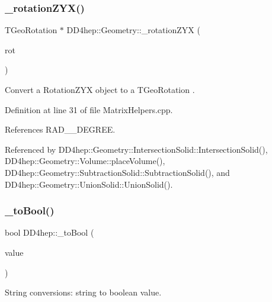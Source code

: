 \subsubsection{\texorpdfstring{\+\_\+rotation\+Z\+Y\+X()}{\_rotationZYX()}}
{\footnotesize\ttfamily T\+Geo\+Rotation $\ast$ D\+D4hep\+::\+Geometry\+::\+\_\+rotation\+Z\+YX (\begin{DoxyParamCaption}\item[{const \hyperlink{namespace_d_d4hep_1_1_geometry_a24667b2b9c3cec3d5239828db4d52189}{Geometry\+::\+Rotation\+Z\+YX} \&}]{rot }\end{DoxyParamCaption})}



Convert a Rotation\+Z\+YX object to a T\+Geo\+Rotation . 



Definition at line 31 of file Matrix\+Helpers.\+cpp.



References R\+A\+D\+\_\+\_\+\+D\+E\+G\+R\+EE.



Referenced by D\+D4hep\+::\+Geometry\+::\+Intersection\+Solid\+::\+Intersection\+Solid(), D\+D4hep\+::\+Geometry\+::\+Volume\+::place\+Volume(), D\+D4hep\+::\+Geometry\+::\+Subtraction\+Solid\+::\+Subtraction\+Solid(), and D\+D4hep\+::\+Geometry\+::\+Union\+Solid\+::\+Union\+Solid().

\hypertarget{group___d_d4_h_e_p___g_e_o_m_e_t_r_y_ga57c16649c26dda84c503948b57737b47}{}\label{group___d_d4_h_e_p___g_e_o_m_e_t_r_y_ga57c16649c26dda84c503948b57737b47} 
\subsubsection{\texorpdfstring{\+\_\+to\+Bool()}{\_toBool()}\hspace{0.1cm}{\footnotesize\ttfamily [1/2]}}
{\footnotesize\ttfamily bool D\+D4hep\+::\+\_\+to\+Bool (\begin{DoxyParamCaption}\item[{const std\+::string \&}]{value }\end{DoxyParamCaption})}



String conversions\+: string to boolean value. 



